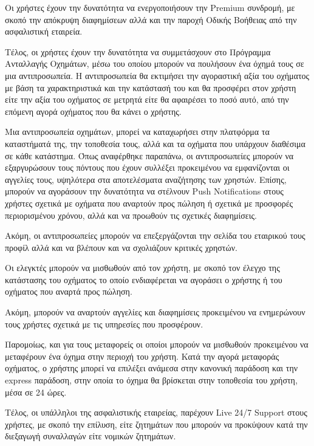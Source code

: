 \documentclass{../ol-softwaremanual}
\begin{document}
	Οι χρήστες έχουν την δυνατότητα να ενεργοποιήσουν την \en Premium \gr συνδρομή, με σκοπό την απόκρυψη διαφημίσεων αλλά και την παροχή Οδικής Βοήθειας από την ασφαλιστική εταιρεία. \break
	
	Τέλος, οι χρήστες έχουν την δυνατότητα να συμμετάσχουν στο Πρόγραμμα Ανταλλαγής Οχημάτων, μέσω του οποίου μπορούν να πουλήσουν ένα όχημά τους σε μια αντιπροσωπεία. Η αντιπροσωπεία θα εκτιμήσει την αγοραστική αξία του οχήματος με βάση τα χαρακτηριστικά και την κατάστασή του και θα προσφέρει στον χρήστη είτε την αξία του οχήματος σε μετρητά είτε θα αφαιρέσει το ποσό αυτό, από την επόμενη αγορά οχήματος που θα κάνει ο χρήστης. \break
	
	\vspace{5pt}
	
	Μια αντιπροσωπεία οχημάτων, μπορεί να καταχωρήσει στην πλατφόρμα τα καταστήματά της, την τοποθεσία τους, αλλά και τα οχήματα που υπάρχουν διαθέσιμα σε κάθε κατάστημα. \break 
	Όπως αναφέρθηκε παραπάνω, οι αντιπροσωπείες μπορούν να εξαργυρώσουν τους πόντους που έχουν συλλέξει προκειμένου να εμφανίζονται οι αγγελίες τους, υψηλότερα στα αποτελέσματα αναζήτησης των χρηστών. Επίσης, μπορούν να αγοράσουν την δυνατότητα να στέλνουν \en Push Notifications \gr στους χρήστες σχετικά με οχήματα που αναρτούν προς πώληση ή σχετικά με προσφορές περιορισμένου χρόνου, αλλά και να προωθούν τις σχετικές διαφημίσεις. \break
	
	Ακόμη, οι αντιπροσωπείες μπορούν να επεξεργάζονται την σελίδα του εταιρικού τους προφίλ αλλά και να βλέπουν και να σχολιάζουν κριτικές χρηστών.	 \break 
	
	\vspace{5pt}	
	
	Οι ελεγκτές μπορούν να μισθωθούν από τον χρήστη, με σκοπό τον έλεγχο της κατάστασης του οχήματος το οποίο ενδιαφέρεται να αγοράσει ο χρήστης ή του οχήματος που αναρτά προς πώληση. \break
	
	Ακόμη, μπορούν να αναρτούν αγγελίες και διαφημίσεις προκειμένου να ενημερώνουν τους χρήστες σχετικά με τις υπηρεσίες που προσφέρουν. \break
	
	Παρομοίως, και για τους μεταφορείς οι οποίοι μπορούν να μισθωθούν προκειμένου να μεταφέρουν ένα όχημα στην περιοχή του χρήστη. Κατά την αγορά μεταφοράς οχήματος, ο χρήστης μπορεί να επιλέξει ανάμεσα στην κανονική παράδοση και την \en express \gr παράδοση, στην οποία το όχημα θα βρίσκεται στην τοποθεσία του χρήστη, μέσα σε 24 ώρες.		\break
	
	
	Τέλος, οι υπάλληλοι της ασφαλιστικής εταιρείας, παρέχουν \en Live 24/7 Support \gr στους χρήστες, με σκοπό την επίλυση, είτε ζητημάτων που μπορούν να προκύψουν κατά την διεξαγωγή συναλλαγών είτε νομικών ζητημάτων. \break
	
\end{document}
